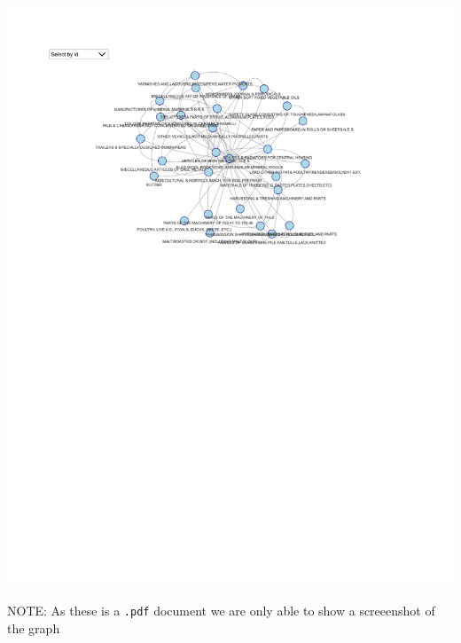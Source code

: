 \documentclass[
]{article}
\begin{document}
\includegraphics{export-network_files/figure-latex/unnamed-chunk-23-1.pdf}

NOTE: As these is a \texttt{.pdf} document we are only able to show a
screeenshot of the graph
\end{document}
